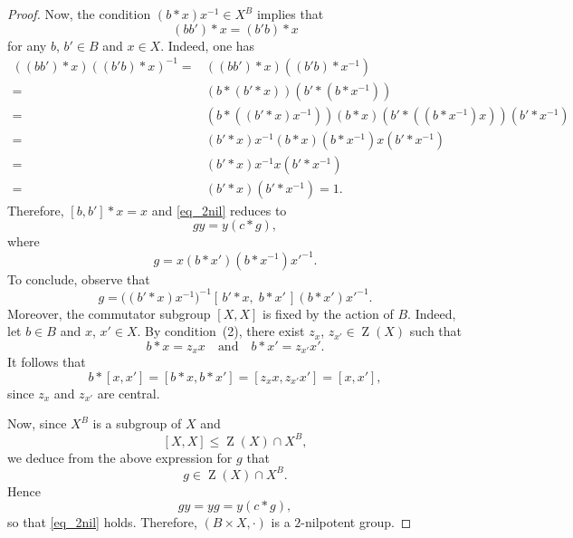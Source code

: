\documentclass[reqno,hidelinks,a4paper]{amsart}
\theoremstyle{plain}
\theoremstyle{definition}
\theoremstyle{remark}
\numberwithin{equation}{section}
\DeclareMathOperator{\bZ}{Z}
\begin{document}
\begin{proof}
    Now, the condition \((b \ast x)x^{-1}\in X^B\) implies that
    \[
        (bb')\ast x=(b'b)\ast x
    \]
    for any \(b\), \(b'\in B\) and \(x\in X\). Indeed, one has
    \begin{align*}
        ((bb') \ast x)((b'b) \ast x)^{-1} = & ((bb') \ast x)((b'b) \ast x^{-1})                                                      \\
        =                                   & (b \ast (b' \ast x)) (b' \ast (b \ast x^{-1}))                                         \\
        =                                   & (b \ast ((b' \ast x) x^{-1})) (b \ast x) (b' \ast ((b \ast x^{-1})x))(b' \ast x^{-1} ) \\
        =                                   & (b' \ast x)x^{-1} (b \ast x) (b \ast x^{-1})x (b' \ast x^{-1} )                        \\
        =                                   & (b' \ast x)x^{-1} x (b' \ast x^{-1} )                                                  \\
        =                                   & (b' \ast x)(b' \ast x^{-1})=1.
    \end{align*}
    Therefore, \([b,b'] \ast x=x\) and \eqref{eq_2nil} reduces to
    \[
        gy = y(c\ast g),
    \]
    where
    \[
        g=x(b\ast x')(b\ast x^{-1})x'^{-1}.
    \]
    To conclude, observe that
    \[
        g=\bigl((b'\ast x)x^{-1}\bigr)^{-1}[\,b'\ast x,\; b\ast x'\,](b\ast x')x'^{-1}.
    \]
    Moreover, the commutator subgroup \([X,X]\) is fixed by the action of \(B\). Indeed, let \(b\in B\) and \(x\), \(x'\in X\). By condition~(2), there exist \(z_x\), \(z_{x'}\in \bZ(X)\) such that
    \[
        b\ast x = z_x x
        \quad\text{and}\quad
        b\ast x' = z_{x'}x'.
    \]
    It follows that
    \[
        b\ast [x,x']=[b\ast x,b\ast x']=[z_xx,z_{x'}x']=[x,x'],
    \]
    since \(z_x\) and \(z_{x'}\) are central.

    Now, since \(X^B\) is a subgroup of \(X\) and
    \[
        [X,X]\leq \bZ(X)\cap X^B,
    \]
    we deduce from the above expression for \(g\) that
    \[
        g\in \bZ(X)\cap X^B.
    \]
    Hence
    \[
        gy = yg = y(c\ast g),
    \]
    so that \eqref{eq_2nil} holds. Therefore, \((B \times X,\cdot)\) is a \(2\)-nilpotent group.
\end{proof}
\end{document}
